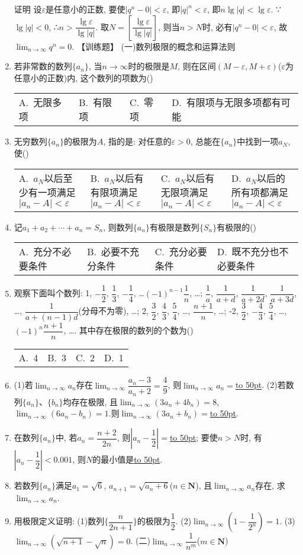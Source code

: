 \documentclass[10pt,a4paper]{article}
\newcommand{\blank}[1]{\underline{\hbox to #1pt{}}}
\newcommand{\fourch}[4]{\par\begin{tabular}{p{.23\textwidth}p{.23\textwidth}p{.23\textwidth}p{.23\textwidth}}
A.~#1 &B.~#2& C.~#3& D.~#4
\end{tabular}}
\begin{document}
\begin{enumerate}[1.]
证明  设$\varepsilon$是任意小的正数, 要使$|q^n-0|<\varepsilon$, 即$|q|^n<\varepsilon$, 即$n\lg|q|<\lg \varepsilon$.
∵$\lg|q|<0$, ∴$n>\dfrac{\lg \varepsilon }{\lg|q|}$.
取$N=[\dfrac{\lg \varepsilon }{\lg|q|}]$, 则当$n>N$时, 必有$|q^n-0|<\varepsilon$, 故$\displaystyle \lim_{n\to \infty} q^n=0$.
【训练题】
(一)数列极限的概念和运算法则
\item 若非常数的数列$\{a_n\}$, 当$n\to \infty$时的极限是$M$, 则在区间$(M-\varepsilon ,M+\varepsilon)$($\varepsilon$为任意小的正数)内, 这个数列的项数为()
\fourch{无限多项}{有限项}{零项}{有限项与无限多项都有可能}
\item 无穷数列$\{a_n\}$的极限为$A$, 指的是: 对任意的$\varepsilon >0$, 总能在$\{a_n\}$中找到一项$a_N$, 使()
\fourch{$a_N$以后至少有一项满足$|a_n-A|<\varepsilon$}{$a_N$以后有有限项满足$|a_n-A|<\varepsilon$}{$a_N$以后有无限项满足$|a_n-A|<\varepsilon$}{$a_N$以后的所有项都满足$|a_n-A|<\varepsilon$}
\item 记$a_1+a_2+\cdots +a_n=S_n$, 则数列$\{a_n\}$有极限是数列$\{S_n\}$有极限的()
\fourch{充分不必要条件}{必要不充分条件}{充分必要条件}{既不充分也不必要条件}
\item 观察下面叫个数列:
1, $-\dfrac 12$, $\dfrac 13$, $-\dfrac 14$, …$(-1)^{n-1}\dfrac 1n$, …;
$\dfrac 1a$, $\dfrac 1{a+d}$, $\dfrac 1{a+2d}$, $\dfrac 1{a+3d}$, …, $\dfrac 1{a+(n-1)d}$(分母不为零), …;
2, $\dfrac 32$, $\dfrac 43$, $\dfrac 54$, …, $\dfrac{n+1}n$, …;
-2, $\dfrac 32$, $-\dfrac 43$, $\dfrac 54$, …, $(-1)^n\dfrac{n+1}n$, ….
其中存在极限的数列的个数为()
\fourch{4}{3}{2}{1}
\item (1)若$\displaystyle \lim_{n\to \infty} a_n$存在$\displaystyle \lim_{n\to \infty} \dfrac{{a_n}-3}{{a_n}+2}=\dfrac 49$, 则$\displaystyle \lim_{n\to \infty} a_n=$\blank{50}.
(2)若数列$\{a_n\}$、$\{b_n\}$均存在极限, 且$\displaystyle \lim_{n\to \infty} (3a_n+4b_n)=8$, $\displaystyle \lim_{n\to \infty} (6a_n-b_n)=1$.则$\displaystyle \lim_{n\to \infty} (3a_n+b_n)=$\blank{50}.
\item 在数列$\{a_n\}$中, 若$a_n=\dfrac{n+2}{2n}$, 则$|a_n-\dfrac 12|=$\blank{50}; 要使$n>N$时, 有$|a_n-\dfrac 12|<0.001$, 则$N$的最小值是\blank{50}.
\item 若数列$\{a_n\}$满足$a_1=\sqrt 6$, $a_{n+1}=\sqrt {a_n+6}$($n\in \mathbf{N}$), 且$\displaystyle \lim_{n\to \infty} a_n$存在, 求$\displaystyle \lim_{n\to \infty} a_n$.
\item 用极限定义证明:
(1)数列$\{\dfrac n{2n+1}\}$的极限为$\dfrac 12$.			(2)$\displaystyle \lim_{n\to \infty} (1-\dfrac 1{2^n})=1$.
(3)$\displaystyle \lim_{n\to \infty} (\sqrt {n+1}-\sqrt n)=0$.
(二)$\displaystyle \lim_{n\to \infty} \dfrac 1{n^m}$($m\in \mathbf{N}$)

\end{enumerate}
\end{document}
